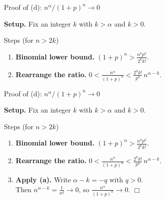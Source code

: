 \documentclass[aspectratio=169,12pt,t]{beamer}
\begin{document}
{%
\begin{frame}{Proof of (d): $n^\alpha / (1+p)^n \to 0$}
  \begin{hlbox}
    \textbf{Setup.} Fix an integer $k$ with $k > \alpha$ and $k > 0$.
  \end{hlbox}

  \vspace{0.4em}
  \begin{proofblock}{Steps (for $n > 2k$)}
    \begin{enumerate}
      \item \textbf{Binomial lower bound.} $\displaystyle (1+p)^n > \frac{n^k p^k}{2^k k!}.$
      \item \textbf{Rearrange the ratio.}
        $\displaystyle 0 < \frac{n^\alpha}{(1+p)^n} < \frac{2^k k!}{p^k}\, n^{\alpha - k}.$
    \end{enumerate}
  \end{proofblock}

\end{frame}

\begin{frame}{Proof of (d): $n^\alpha / (1+p)^n \to 0$}
  \begin{hlbox}
    \textbf{Setup.} Fix an integer $k$ with $k > \alpha$ and $k > 0$.
  \end{hlbox}

  \vspace{0.4em}
  \begin{proofblock}{Steps (for $n > 2k$)}
    \begin{enumerate}
      \item \textbf{Binomial lower bound.} $\displaystyle (1+p)^n > \frac{n^k p^k}{2^k k!}.$
      \item \textbf{Rearrange the ratio.}
        $\displaystyle 0 < \frac{n^\alpha}{(1+p)^n} < \frac{2^k k!}{p^k}\, n^{\alpha - k}.$
      \item \textbf{Apply (a).} Write $\alpha - k = -q$ with $q > 0$. \\
      Then $\displaystyle n^{\alpha - k} = \frac{1}{n^q} \to 0$, so $\displaystyle \frac{n^\alpha}{(1+p)^n} \to 0$. \quad $\Box$
    \end{enumerate}
  \end{proofblock}


\end{frame}}
\end{document}
